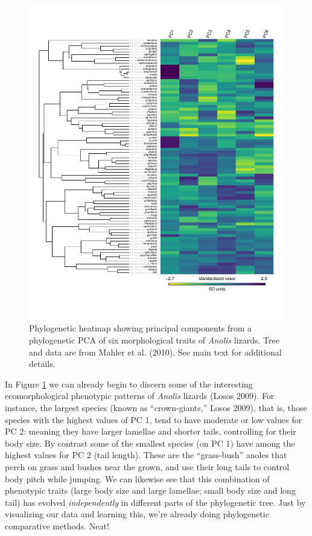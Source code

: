 \documentclass[fleqn,10pt,lineno]{wlpeerj} %
\begin{document}
\begin{figure}
\includegraphics[width=1\linewidth]{Revell.phytools-v2_peerj_files/figure-latex/anole-heatmap-1} \caption{Phylogenetic heatmap showing principal components from a phylogenetic PCA of six morphological traits of \textit{Anolis} lizards. Tree and data are from Mahler et al. (2010). See main text for additional details.}\label{fig:anole-heatmap}
\end{figure}

In Figure \ref{fig:anole-heatmap} we can already begin to discern some of the interesting ecomorphological phenotypic patterns of \emph{Anolis} lizards (Losos 2009). For instance, the largest species (known as ``crown-giants,'' Losos 2009), that is, those species with the highest values of PC 1, tend to have moderate or low values for PC 2: meaning they have larger lamellae and shorter tails, controlling for their body size. By contrast some of the smallest species (on PC 1) have among the highest values for PC 2 (tail length). These are the ``grass-bush'' anoles that perch on grass and bushes near the grown, and use their long tails to control body pitch while jumping. We can likewise see that this combination of phenotypic traits (large body size and large lamellae; small body size and long tail) has evolved \emph{independently} in different parts of the phylogenetic tree. Just by visualizing our data and learning this, we're already doing phylogenetic comparative methods. Neat!
\end{document}
